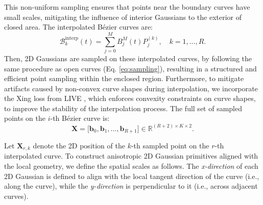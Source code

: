 This non-uniform sampling ensures that points near the boundary curves have small scales, mitigating the influence of interior Gaussians to the exterior of closed area. The interpolated Bézier curves are:
\begin{equation}
\mathcal{B}_k^{\text{interp}}(t) = \sum_{j=0}^{M} B_j^M(t) P^{(k)}_j, \quad k = 1, \dots, R.
\end{equation}
Then, 2D Gaussians are sampled on these interpolated curves, by following the same procedure as open curves (Eq. \ref{eq:sampling}), resulting in a structured and efficient point sampling within the enclosed region. Furthermore, to mitigate artifacts caused by non-convex curve shapes during interpolation, we incorporate the Xing loss from LIVE \cite{xu2022live}, which enforces convexity constraints on curve shapes, to improve the stability of the interpolation process.
The full set of sampled points on the $i$-th Bézier curve is:
\begin{equation}
\mathbf{X} = \big[ \mathbf{b}_0, \mathbf{b}_1, \dots, \mathbf{b}_{R+1} \big] \in \mathbb{R}^{{(R+2)} \times K \times 2}.
\end{equation}


Let $\mathbf{X}_{r,k}$ denote the 2D position of the $k$-th sampled point on the $r$-th interpolated curve.
To construct anisotropic 2D Gaussian primitives aligned with the local geometry, we define the spatial scales as follows.
The \emph{x-direction} of each 2D Gaussian is defined to align with the local tangent direction of the curve (i.e., along the curve),
while the \emph{y-direction} is perpendicular to it (i.e., across adjacent curves).

